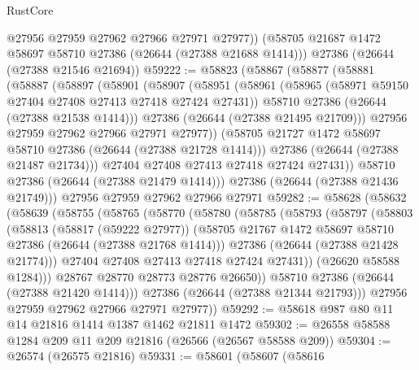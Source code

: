 \begin{lexlean}{RustCore}
\begin{coremodule}
        @27956
        @27959
        @27962
        @27966
        @27971
        @27977))
    (@58705 @21687 @1472 @58697 @58710 @27386 (@26644 (@27388 @21688 @1414)))
    @27386
    (@26644 (@27388 @21546 @21694))
@59222 := @58823
    (@58867
      (@58877
        (@58881
          (@58887
            (@58897
              (@58901
                (@58907
                  (@58951
                    (@58961
                      (@58965 (@58971 @59150 @27404 @27408 @27413 @27418 @27424 @27431))
                      @58710
                      @27386
                      (@26644 (@27388 @21538 @1414)))
                    @27386
                    (@26644 (@27388 @21495 @21709)))
                  @27956
                  @27959
                  @27962
                  @27966
                  @27971
                  @27977))
              (@58705 @21727 @1472 @58697 @58710 @27386 (@26644 (@27388 @21728 @1414)))
              @27386
              (@26644 (@27388 @21487 @21734)))
            @27404
            @27408
            @27413
            @27418
            @27424
            @27431))
        @58710
        @27386
        (@26644 (@27388 @21479 @1414)))
      @27386
      (@26644 (@27388 @21436 @21749)))
    @27956
    @27959
    @27962
    @27966
    @27971
@59282 := @58628
    (@58632
      (@58639
        (@58755
          (@58765
            (@58770
              (@58780
                (@58785
                  (@58793
                    (@58797
                      (@58803
                        (@58813
                          (@58817 (@59222 @27977))
                          (@58705 @21767 @1472 @58697 @58710 @27386 (@26644 (@27388 @21768 @1414)))
                          @27386
                          (@26644 (@27388 @21428 @21774)))
                        @27404
                        @27408
                        @27413
                        @27418
                        @27424
                        @27431))
                    (@26620 @58588 @1284)))
                @28767
                @28770
                @28773
                @28776
                @26650))
            @58710
            @27386
            (@26644 (@27388 @21420 @1414)))
          @27386
          (@26644 (@27388 @21344 @21793)))
        @27956
        @27959
        @27962
        @27966
        @27971
        @27977))
@59292 := @58618 @987 @80 @11 @14 @21816 @1414 @1387 @1462 @21811 @1472
@59302 := @26558 @58588 @1284 @209 @11 @209 @21816 (@26566 (@26567 @58588 @209))
@59304 := @26574 (@26575 @21816)
@59331 := @58601
    (@58607
      (@58616

\end{coremodule}
\end{lexlean}
